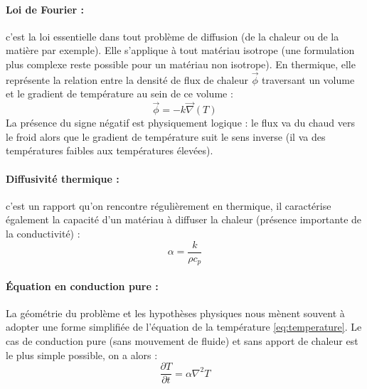 \paragraph{Loi de Fourier :}c'est la loi essentielle dans tout problème de diffusion (de la chaleur ou de la matière par exemple). Elle s'applique à tout matériau isotrope (une formulation plus complexe reste possible pour un matériau non isotrope). En thermique, elle représente la relation entre la densité de flux de chaleur $\vec{\phi}$ traversant un volume et le gradient de température au sein de ce volume :
%
\begin{equation}
    \vec{\phi} = - k \vec{\nabla}(T)
    \label{eq:fourier}
\end{equation}
%
La présence du signe négatif est physiquement logique : le flux va du chaud vers le froid alors que le gradient de température suit le sens inverse (il va des températures faibles aux températures élevées).
%
\begin{center}
\end{center}


\paragraph{Diffusivité thermique :}c'est un rapport qu'on rencontre régulièrement en thermique, il caractérise également la capacité d'un matériau à diffuser la chaleur (présence importante de la conductivité) :
%
\begin{equation}
    \alpha = \frac{k}{\rho c_p}
\end{equation}


\paragraph{Équation en conduction pure :}
%
La géométrie du problème et les hypothèses physiques nous mènent souvent à adopter une forme simplifiée de l'équation de la température \eqref{eq:temperature}. Le cas de conduction pure (sans mouvement de fluide) et sans apport de chaleur est le plus simple possible, on a alors :
%
\begin{equation}
    \frac{\partial T}{\partial t}
    = \alpha \nabla^2 T
\end{equation}

